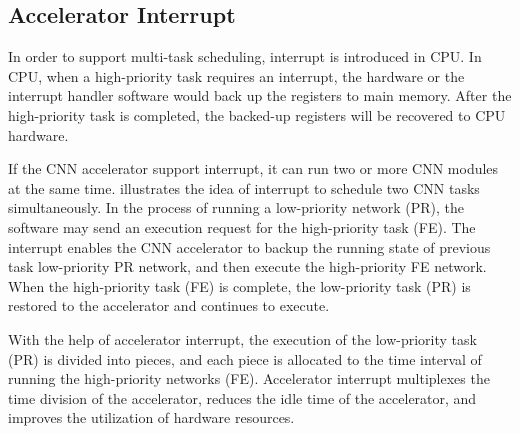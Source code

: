 

\subsection{Accelerator Interrupt}

In order to support multi-task scheduling, interrupt is introduced in CPU. 
In CPU, when a high-priority task requires an interrupt, the hardware or the interrupt handler software would back up the registers to main memory.
After the high-priority task is completed, the backed-up registers will be recovered to CPU hardware. 

If the CNN accelerator support interrupt, it can run two or more CNN modules at the same time.  illustrates the idea of interrupt to schedule two CNN tasks simultaneously. In the process of running a low-priority network (PR), the software may send an execution request for the high-priority task (FE). The interrupt enables the CNN accelerator to backup the running state of previous task low-priority PR network, and then execute the high-priority FE network. When the high-priority task (FE) is complete, the low-priority task (PR) is restored to the accelerator and continues to execute.

With the help of accelerator interrupt, the execution of the low-priority task (PR) is divided into pieces, and each piece is allocated to the time interval of running the high-priority networks (FE). 
Accelerator interrupt multiplexes the time division of the accelerator, reduces the idle time of the accelerator, and improves the utilization of hardware resources. 

